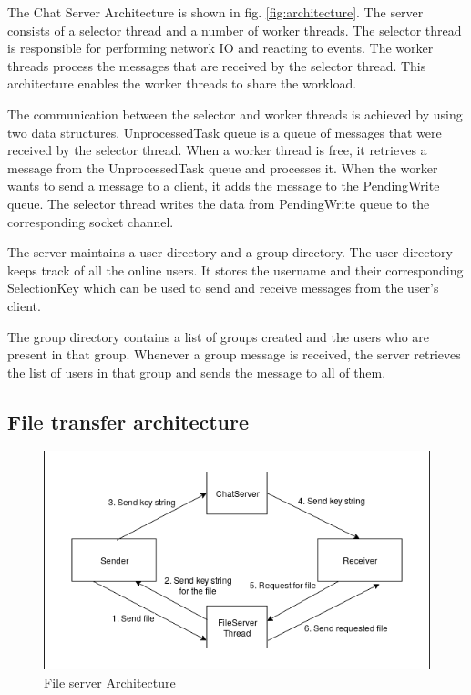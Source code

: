 \documentclass{article}
\begin{document}
The Chat Server Architecture is shown in fig. \ref{fig:architecture}. The server consists of a selector thread and a number of worker threads.
The selector thread is responsible for performing network IO and reacting to events. The worker threads process the messages that are received by the selector thread.
This architecture enables the worker threads to share the workload.

The communication between the selector and worker threads is achieved by using two data structures. UnprocessedTask queue is a queue of messages that were received by the selector thread. 
When a worker thread is free, it retrieves a message from the UnprocessedTask queue and processes it.
When the worker wants to send a message to a client, it adds the message to the PendingWrite queue. 
The selector thread writes the data from PendingWrite queue to the corresponding socket channel.

The server maintains a user directory and a group directory. 
The user directory keeps track of all the online users. 
It stores the username and their corresponding SelectionKey which can be used to send and receive messages from the user's client.

The group directory contains a list of groups created and the users who are present in that group. Whenever a group message is received, the server retrieves the list of users in that group and sends the message to all of them.

\subsection{File transfer architecture}

\begin{figure}
	\includegraphics[width=\linewidth]{fileserver.png}
	\caption{File server Architecture}
	\label{fig:fileserverarchitecture}
\end{figure}
\end{document}
